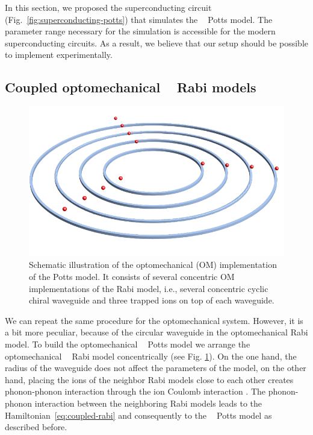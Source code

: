 \documentclass[reprint, aps, prx, amsmath, amssymb, longbibliography, superscriptaddress]{revtex4-2}
\DeclareMathOperator{\Zthree}{\mathbb{Z}_3}
\begin{document}
In this section, we proposed the superconducting circuit (Fig.~\ref{fig:superconducting-potts}) that simulates the $\Zthree$ Potts model. The parameter range necessary for the simulation is accessible for the modern superconducting circuits. As a result, we believe that our setup should be possible to implement experimentally.


\subsection{Coupled optomechanical \texorpdfstring{$\Zthree$}{Z3} Rabi models}

\begin{figure}[t]
    \centering
    \includegraphics[width = 0.8 \linewidth]{pics/optomechanical_Potts_pic.pdf}
    \caption{Schematic illustration of the optomechanical (OM) implementation of the Potts model. It consists of several concentric OM implementations of the Rabi model, i.e., several concentric cyclic chiral waveguide and three trapped ions on top of each waveguide.}
    \label{fig:optomechanical-potts}
\end{figure}

We can repeat the same procedure for the optomechanical system. However, it is a bit more peculiar, because of the circular waveguide in the optomechanical Rabi model. To build the optomechanical $\Zthree$ Potts model we arrange the optomechanical $\Zthree$ Rabi model concentrically (see Fig. \ref{fig:optomechanical-potts}). On the one hand, the radius of the waveguide does not affect the parameters of the model, on the other hand, placing the ions of the neighbor Rabi models close to each other creates phonon-phonon interaction through the ion Coulomb interaction \cite{schneider_experimental_2012,timm_dynamics_2023}. The phonon-phonon interaction between the neighboring Rabi models leads to the Hamiltonian~\eqref{eq:coupled-rabi} and consequently to the $\Zthree$ Potts model as described before.
\end{document}

